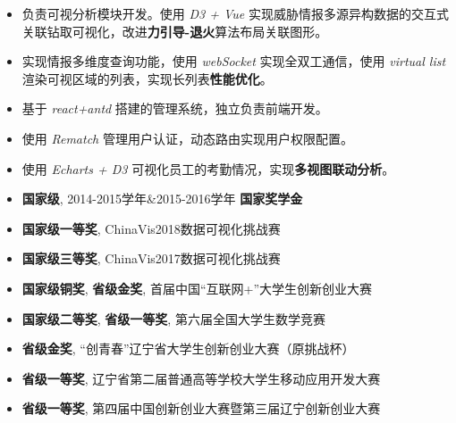 \documentclass[10pt,a4paper]{altacv}
\begin{document}
\begin{CJK}{UTF8}{gbsn}
\divider

\begin{itemize}
\item 负责可视分析模块开发。使用 \textit{D3 + Vue}  实现威胁情报多源异构数据的交互式关联钻取可视化，改进\textbf{力引导-退火}算法布局关联图形。
\item 实现情报多维度查询功能，使用 \textit{webSocket} 实现全双工通信，使用 \textit{virtual list} 渲染可视区域的列表，实现长列表\textbf{性能优化}。
\end{itemize}

\divider

\begin{itemize}
\item 基于 \textit{react+antd} 搭建的管理系统，独立负责前端开发。
\item 使用 \textit{Rematch} 管理用户认证，动态路由实现用户权限配置。
\item 使用 \textit{Echarts + D3} 可视化员工的考勤情况，实现\textbf{多视图联动分析}。
\end{itemize}

\medskip


\begin{CJK}{UTF8}{gkai}
\end{CJK}

\begin{itemize}
\item \textbf{国家级}, 2014-2015学年&2015-2016学年 \textbf{国家奖学金}
\item \textbf{国家级一等奖}, ChinaVis2018数据可视化挑战赛
\item \textbf{国家级三等奖}, ChinaVis2017数据可视化挑战赛
\item \textbf{国家级铜奖}, \textbf{省级金奖}, 首届中国“互联网+”大学生创新创业大赛
\item \textbf{国家级二等奖}, \textbf{省级一等奖}, 第六届全国大学生数学竞赛
\item \textbf{省级金奖}, “创青春”辽宁省大学生创新创业大赛（原挑战杯）
\item \textbf{省级一等奖}, 辽宁省第二届普通高等学校大学生移动应用开发大赛
\item \textbf{省级一等奖}, 第四届中国创新创业大赛暨第三届辽宁创新创业大赛
\end{itemize}

\end{CJK}
\end{document}
